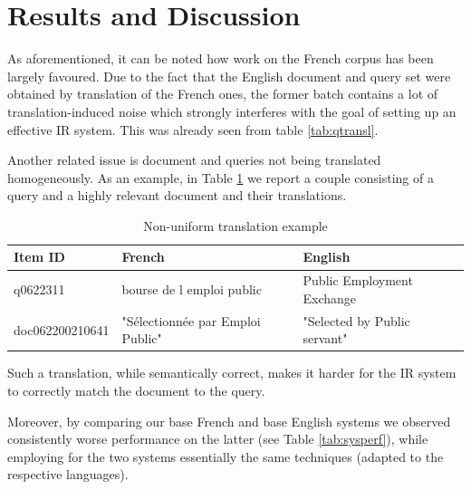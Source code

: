 \section{Results and Discussion}
\label{sec:results}
%
%
As aforementioned, it can be noted how work on the French corpus has been largely favoured.
Due to the fact that the English document and query set were obtained by translation of the French ones, the former batch contains a lot of translation-induced noise which strongly interferes with the goal of setting up an effective IR system. This was already seen from table \ref{tab:qtransl}.

\par Another related issue is document and queries not being translated homogeneously. As an example, in Table \ref{tab:nonuntransl} we report a couple consisting of a query and a highly relevant document and their translations.
\begin{table}[h!]
  \caption{Non-uniform translation example}
  \label{tab:nonuntransl}
  \centering
  \begin{tabular}{|l|l|l|}
    \toprule
    Item ID&French&English\\
    \midrule
    q0622311 & bourse de l emploi public & Public Employment Exchange\\
doc062200210641 & "Sélectionnée par Emploi Public" & "Selected by Public servant"\\
  \bottomrule
\end{tabular}
\end{table}
Such a translation, while semantically correct, makes it harder for the IR system to correctly match the document to the query.
\par Moreover, by comparing our base French and base English systems we observed consistently worse performance on the latter (see Table \ref{tab:sysperf}), while employing for the two systems essentially the same techniques (adapted to the respective languages).
\par

